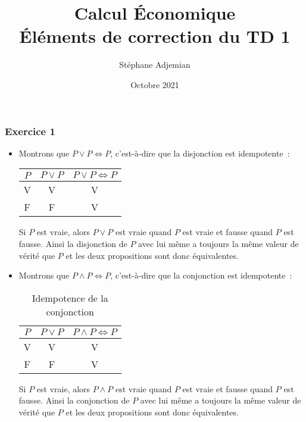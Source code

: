 \documentclass[10pt,notheorems]{beamer}
\theoremstyle{plain}
\theoremstyle{definition} %
\begin{document}
\title{Calcul Économique\\\small{Éléments de correction du TD 1}}
\author[S. Adjemian]{Stéphane Adjemian}
 \date{Octobre 2021}

\begin{frame}
  \titlepage{}
\end{frame}


\begin{frame}
  \frametitle{Exercice 1}
  \fontsize{8}{10}\selectfont

  \begin{itemize}

  \item Montrons que $P\lor P \Leftrightarrow P$, c'est-à-dire que la disjonction est idempotente~:\newline
    \begin{table}[H]
      \centering
      \begin{tabular}[H]{|cc|c|}
        \hline
        $P$ & $P\lor P$ & $P\lor P \Leftrightarrow P$\\ \hline
        V & V & V \\
        F & F & V \\
        \hline\hline
      \end{tabular}
      \label{tab:or:idempotence}
    \end{table}

    \bigskip

  Si $P$ est vraie, alors $P\lor P$ est vraie quand $P$ est vraie et fausse
  quand $P$ est fausse. Ainsi la disjonction de $P$ avec lui même a toujours la
  même valeur de vérité que $P$ et les deux propositions sont donc équivalentes.\newline

  \item Montrons que $P\land P \Leftrightarrow P$, c'est-à-dire que la conjonction est idempotente~:\newline
    \begin{table}[H]
      \centering
      \begin{tabular}[H]{|cc|c|}
        \hline
        $P$ & $P\lor P$ & $P\land P \Leftrightarrow P$\\ \hline
        V & V & V \\
        F & F & V \\
        \hline\hline
      \end{tabular}
      \caption{Idempotence de la conjonction}
      \label{tab:and:idempotence}
    \end{table}

    \bigskip

  Si $P$ est vraie, alors $P\land P$ est vraie quand $P$ est vraie et fausse
  quand $P$ est fausse. Ainsi la conjonction de $P$ avec lui même a toujours la
  même valeur de vérité que $P$ et les deux propositions sont donc équivalentes.

  \end{itemize}

\end{frame}
\end{document}

